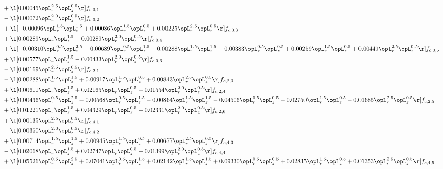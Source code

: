 \begin{alignat}{2}
& + \l[  0.00045 \opL_r^{2.5} \opL_z^{0.5}  \r] f_{c,0,1} \nonumber \\ 
& - \l[  0.00072 \opL_r^{2.0} \opL_z^{0.5}  \r] f_{c,0,2} \nonumber \\ 
& + \l[  -0.00096 \opL_r^{1.5} \opL_z^{1.5} +  0.00086 \opL_r^{1.5} \opL_z^{0.5} +  0.00225 \opL_r^{2.5} \opL_z^{0.5}  \r] f_{c,0,3} \nonumber \\ 
& + \l[  0.00289 \opL_r \opL_z^{1.5}   -0.00289 \opL_r^{2.0} \opL_z^{0.5}  \r] f_{c,0,4} \nonumber \\ 
& + \l[  -0.00310 \opL_r^{0.5} \opL_z^{2.5}   -0.00689 \opL_r^{0.5} \opL_z^{1.5}   -0.00288 \opL_r^{1.5} \opL_z^{1.5}   -0.00383 \opL_r^{0.5} \opL_z^{0.5} +  0.00259 \opL_r^{1.5} \opL_z^{0.5} +  0.00449 \opL_r^{2.5} \opL_z^{0.5}  \r] f_{c,0,5} \nonumber \\ 
& + \l[  0.00577 \opL_r \opL_z^{1.5}   -0.00433 \opL_r^{2.0} \opL_z^{0.5}  \r] f_{c,0,6} \nonumber \\ 
& - \l[  0.00169 \opL_r^{2.5} \opL_z^{0.5}  \r] f_{c,2,1} \nonumber \\ 
& - \l[  0.00288 \opL_r^{1.5} \opL_z^{1.5} +  0.00917 \opL_r^{1.5} \opL_z^{0.5} +  0.00843 \opL_r^{2.5} \opL_z^{0.5}  \r] f_{c,2,3} \nonumber \\ 
& + \l[  0.00611 \opL_r \opL_z^{1.5} +  0.02165 \opL_r \opL_z^{0.5} +  0.01554 \opL_r^{2.0} \opL_z^{0.5}  \r] f_{c,2,4} \nonumber \\ 
& + \l[  0.00436 \opL_r^{0.5} \opL_z^{2.5}   -0.00568 \opL_r^{0.5} \opL_z^{1.5}   -0.00864 \opL_r^{1.5} \opL_z^{1.5}   -0.04506 \opL_r^{0.5} \opL_z^{0.5}   -0.02750 \opL_r^{1.5} \opL_z^{0.5}   -0.01685 \opL_r^{2.5} \opL_z^{0.5}  \r] f_{c,2,5} \nonumber \\ 
& + \l[  0.01221 \opL_r \opL_z^{1.5} +  0.04329 \opL_r \opL_z^{0.5} +  0.02331 \opL_r^{2.0} \opL_z^{0.5}  \r] f_{c,2,6} \nonumber \\ 
& + \l[  0.00135 \opL_r^{2.5} \opL_z^{0.5}  \r] f_{c,4,1} \nonumber \\ 
& - \l[  0.00350 \opL_r^{2.0} \opL_z^{0.5}  \r] f_{c,4,2} \nonumber \\ 
& + \l[  0.00714 \opL_r^{1.5} \opL_z^{1.5} +  0.00945 \opL_r^{1.5} \opL_z^{0.5} +  0.00677 \opL_r^{2.5} \opL_z^{0.5}  \r] f_{c,4,3} \nonumber \\ 
& - \l[  0.02068 \opL_r \opL_z^{1.5} +  0.02747 \opL_r \opL_z^{0.5} +  0.01399 \opL_r^{2.0} \opL_z^{0.5}  \r] f_{c,4,4} \nonumber \\ 
& + \l[  0.05526 \opL_r^{0.5} \opL_z^{2.5} +  0.07041 \opL_r^{0.5} \opL_z^{1.5} +  0.02142 \opL_r^{1.5} \opL_z^{1.5} +  0.09330 \opL_r^{0.5} \opL_z^{0.5} +  0.02835 \opL_r^{1.5} \opL_z^{0.5} +  0.01353 \opL_r^{2.5} \opL_z^{0.5}  \r] f_{c,4,5} \nonumber \\ 

\end{alignat}
